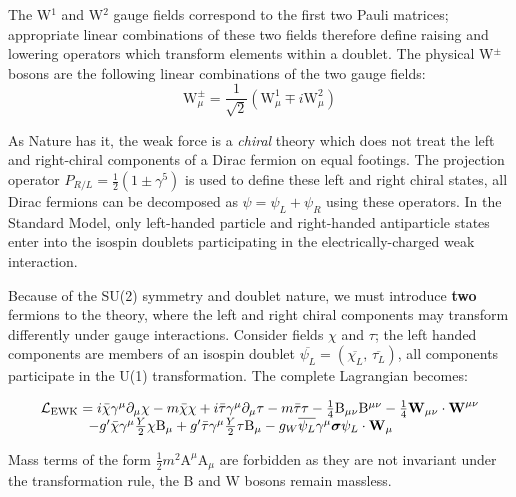 The W$^{1}$ and W$^{2}$ gauge fields correspond to the first two Pauli matrices; appropriate linear combinations of these two fields therefore define raising and lowering operators which transform elements within a doublet. The physical W$^{\pm}$ bosons are the following linear combinations of the two gauge fields:
\begin{equation}
\mathrm{W}_{\mu}^{\pm} = \frac{1}{\sqrt{2}} ( \mathrm{W}^{1}_{\mu} \mp i\mathrm{W}_{\mu}^{2})
\end{equation}

As Nature has it, the weak force is a \textit{chiral} theory which does not treat the left and right-chiral components of a Dirac fermion on equal footings.  The projection operator $P_{R/L} = \frac{1}{2} ( 1 \pm \gamma^{5})$ is used to define these left and right chiral states, all Dirac fermions can be decomposed as $\psi = \psi_{L} + \psi_{R}$ using these operators. In the Standard Model, only left-handed particle and right-handed antiparticle states enter into the isospin doublets participating in the electrically-charged weak interaction. 

Because of the SU(2) symmetry and doublet nature, we must introduce \textbf{two} fermions to the theory, where the left and right chiral components may transform differently under gauge interactions. Consider fields  $\chi$ and  $\tau$; the left handed components are members of an isospin doublet $\overline{\psi_{L}}=(\overline{\chi_{L}},\,\overline{\tau_{L}})$, all components participate in the U(1) transformation. The complete Lagrangian becomes:

\begin{equation}
\begin{array}{l}
\mathcal{L}_{\mathrm{EWK}} = 
i \bar{\chi} \gamma^{\mu} \partial_{\mu} \chi - m \bar{\chi} \chi
+ i \bar{\tau}   \gamma^{\mu}    \partial_{\mu} \tau  - m \bar{\tau} \tau
- \frac{1}{4}\mathrm{B}_{\mu\nu}\mathrm{B}^{\mu\nu}
-\frac{1}{4}\bm{\mathrm{W}}_{\mu\nu} \cdot \bm{\mathrm{W}}^{\mu\nu} \\
\hspace{1.2cm}
-  g' \bar{\chi} \gamma^{\mu} \frac{Y}{2} \chi \mathrm{B}_{\mu} + g' \bar{\tau} \gamma^{\mu} \frac{Y}{2} \tau \mathrm{B}_{\mu}
- g_W  \overline{\psi_{L}} \gamma^{\mu} \bm{\sigma} \psi_{L} \cdot \bm{\mathrm{W}}_{\mu}
\end{array}
\end{equation}

Mass terms of the form $\frac{1}{2}m^{2}\mathrm{A}^{\mu}\mathrm{A}_{\mu}$ are forbidden as they are not invariant under the transformation rule, the B and $\bm{\mathrm{W}}$ bosons remain massless.


